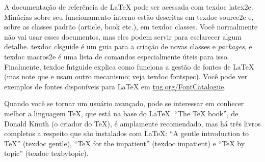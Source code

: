 A documentação de referência de \LaTeX{} pode ser acessada com \textsf{texdoc
latex2e}. Minúcias sobre seu funcionamento interno estão descritas em
\textsf{texdoc source2e} e, sobre as classes padrão (\textsf{article, book}
etc.), em \textsf{texdoc classes}. Você normalmente não vai usar esses
documentos, mas eles podem servir para esclarecer algum detalhe.
\textsf{texdoc clsguide} é um guia para a criação de novas classes e
\textit{packages}, e \textsf{texdoc macros2e} é uma lista de comandos
especialmente úteis para isso. Finalmente, \textsf{texdoc fntguide} explica
como funciona a gestão de fontes de \LaTeX{} (mas note que \LuaLaTeX{} e
\XeLaTeX{} usam outro mecanismo; veja \textsf{texdoc fontspec}). Você pode ver
exemplos de fontes disponíveis para \LaTeX{} em \url{tug.org/FontCatalogue}.

Quando você se tornar um usuário avançado, pode se interessar em conhecer
melhor a linguagem \TeX{}, que está na base do \LaTeX{}. ``The \TeX{} book'',
de Donald Knuth (o criador do \TeX), é amplamente recomendado, mas há três
livros completos a respeito que são instalados com \LaTeX{}: ``A gentle
introduction to \TeX{}'' (\textsf{texdoc gentle}), ``\TeX{} for the
impatient'' (\textsf{texdoc impatient}) e ``\TeX{} by topic'' (\textsf{texdoc
texbytopic}).

